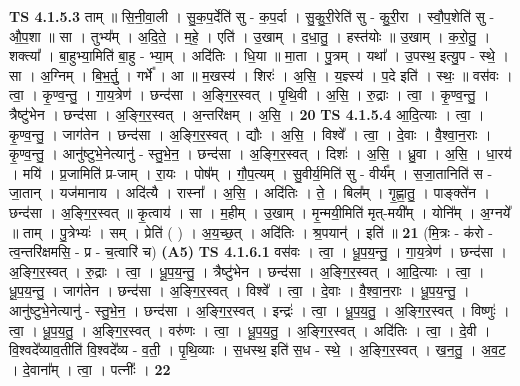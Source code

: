 \documentclass[17pt]{extarticle}
\begin{document}
                  \newline
                                \textbf{ TS 4.1.5.3} \newline
                  ताम् ॥ सि॒नी॒वा॒ली । सु॒क॒प॒र्देति॑ सु - क॒प॒र्दा । सु॒कु॒री॒रेति॑ सु - कु॒री॒रा । स्वौ॒प॒शेति॑ सु - औ॒प॒शा ॥ सा । तुभ्य᳚म् । अ॒दि॒ते॒ । म॒हे॒ । एति॑ । उ॒खाम् । द॒धा॒तु॒ । हस्त॑योः ॥ उ॒खाम् । क॒रो॒तु॒ । शक्त्या᳚ । बा॒हुभ्या॒मिति॑ बा॒हु - भ्या॒म् । अदि॑तिः । धि॒या ॥ मा॒ता । पु॒त्रम् । यथा᳚ । उ॒पस्थ॒ इत्यु॒प - स्थे॒ । सा । अ॒ग्निम् । बि॒भ॒र्तु॒ । गर्भे᳚ । आ ॥ म॒खस्य॑ । शिरः॑ । अ॒सि॒ । य॒ज्ञ्स्य॑ । प॒दे इति॑ । स्थः॒ ॥ वस॑वः । त्वा॒ । कृ॒ण्व॒न्तु॒ । गा॒य॒त्रेण॑ । छन्द॑सा । अ॒ङ्गि॒र॒स्वत् । पृ॒थि॒वी । अ॒सि॒ । रु॒द्राः । त्वा॒ । कृ॒ण्व॒न्तु॒ । त्रैष्टु॑भेन । छन्द॑सा । अ॒ङ्गि॒र॒स्वत् । अ॒न्तरि॑क्षम् । अ॒सि॒ । \textbf{  20} \newline
                  \newline
                                \textbf{ TS 4.1.5.4} \newline
                  आ॒दि॒त्याः । त्वा॒ । कृ॒ण्व॒न्तु॒ । जाग॑तेन । छन्द॑सा । अ॒ङ्गि॒र॒स्वत् । द्यौः । अ॒सि॒ । विश्वे᳚ । त्वा॒ । दे॒वाः । वै॒श्वा॒न॒राः । कृ॒ण्व॒न्तु॒ । आनु॑ष्टुभे॒नेत्यानु॑ - स्तु॒भे॒न॒ । छन्द॑सा । अ॒ङ्गि॒र॒स्वत् । दिशः॑ । अ॒सि॒ । ध्रु॒वा । अ॒सि॒ । धा॒रय॑ । मयि॑ । प्र॒जामिति॑ प्र-जाम् । रा॒यः । पोष᳚म् । गौ॒प॒त्यम् । सु॒वीर्य॒मिति॑ सु - वीर्य᳚म् । स॒जा॒तानिति॑ स - जा॒तान् । यज॑मानाय । अदि॑त्यै । रास्ना᳚ । अ॒सि॒ । अदि॑तिः । ते॒ । बिल᳚म् । गृ॒ह्णा॒तु॒ । पाङ्क्ते॑न । छन्द॑सा । अ॒ङ्गि॒र॒स्वत् ॥ कृ॒त्वाय॑ । सा । म॒हीम् । उ॒खाम् । मृ॒न्मयी॒मिति॑ मृत्-मयी᳚म् । योनि᳚म् । अ॒ग्नये᳚ ॥ ताम् । पु॒त्रेभ्यः॑ । सम् । प्रेति॑ ( ) । अ॒य॒च्छ॒त् । अदि॑तिः । श्र॒पयान्॑ । इति॑ ॥ \textbf{  21} \newline
                  \newline
                      (मि॒त्रः - क॑रो - त्व॒न्तरि॑क्षमसि॒ - प्र - च॒त्वारि॑ च)  \textbf{(A5)} \newline \newline
                                \textbf{ TS 4.1.6.1} \newline
                  वस॑वः । त्वा॒ । धू॒प॒य॒न्तु॒ । गा॒य॒त्रेण॑ । छन्द॑सा । अ॒ङ्गि॒र॒स्वत् । रु॒द्राः । त्वा॒ । धू॒प॒य॒न्तु॒ । त्रैष्टु॑भेन । छन्द॑सा । अ॒ङ्गि॒र॒स्वत् । आ॒दि॒त्याः । त्वा॒ । धू॒प॒य॒न्तु॒ । जाग॑तेन । छन्द॑सा । अ॒ङ्गि॒र॒स्वत् । विश्वे᳚ । त्वा॒ । दे॒वाः । वै॒श्वा॒न॒राः । धू॒प॒य॒न्तु॒ । आनु॑ष्टुभे॒नेत्यानु॑ - स्तु॒भे॒न॒ । छन्द॑सा । अ॒ङ्गि॒र॒स्वत् । इन्द्रः॑ । त्वा॒ । धू॒प॒य॒तु॒ । अ॒ङ्गि॒र॒स्वत् । विष्णुः॑ । त्वा॒ । धू॒प॒य॒तु॒ । अ॒ङ्गि॒र॒स्वत् । वरु॑णः । त्वा॒ । धू॒प॒य॒तु॒ । अ॒ङ्गि॒र॒स्वत् । अदि॑तिः । त्वा॒ । दे॒वी । वि॒श्वदे᳚व्याव॒तीति॑ वि॒श्वदे᳚व्य - व॒ती॒ । पृ॒थि॒व्याः । स॒धस्थ॒ इति॑ स॒ध - स्थे॒ । अ॒ङ्गि॒र॒स्वत् । ख॒न॒तु॒ । अ॒व॒ट॒ । दे॒वाना᳚म् । त्वा॒ । पत्नीः᳚ । \textbf{  22} \newline
\end{document}
